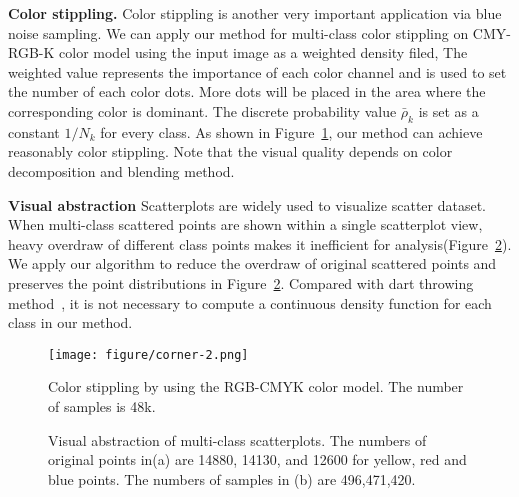 \textbf{Color stippling.}
Color stippling is another very important application via blue noise sampling.
We can apply our method for multi-class color stippling on CMY-RGB-K color model using the input image as a weighted density filed,
The weighted value represents the importance of each color channel and is used to set the number of each color dots.
More dots will be placed in the
area where the corresponding color is dominant.
The discrete probability value $\bar\rho_k$ is set as a constant $1/N_k$ for every class.
As shown in Figure~\ref{Color stippling},
our method can achieve reasonably color stippling.
Note that the visual quality depends on color decomposition and blending method.

\textbf{Visual abstraction}
Scatterplots are widely used to visualize scatter dataset.
When multi-class scattered points are shown within a single scatterplot view, heavy overdraw of different class points makes it inefficient for analysis(Figure~\ref{visual-abstraction}).
We apply our algorithm to reduce the overdraw of original scattered points and preserves the point distributions in Figure~\ref{visual-abstraction}.
Compared with dart throwing method~\cite{wei:2010:multi,chen:2014:visual},
it is not necessary to compute a continuous density function for each class in our method.



\begin{figure}[htb]
  \centering
    \texttt{[image: figure/corner-2.png]}
   \caption{Color stippling by using the RGB-CMYK color model.
  The number of samples is 48k.  }\label{Color stippling}
\end{figure}

\begin{figure}[htb]
  \centering

  \caption{Visual abstraction of multi-class scatterplots.
   The numbers of original points in(a) are 14880, 14130, and 12600 for yellow, red and blue points.
   The numbers of samples in (b) are 496,471,420.}
   \label{visual-abstraction}
\end{figure}


